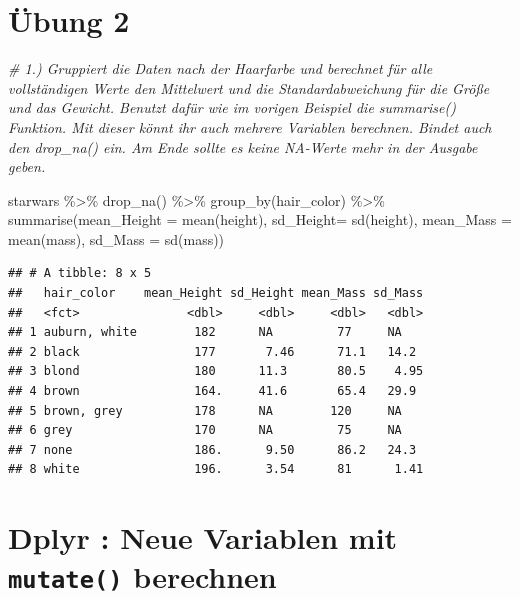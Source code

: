 \documentclass[
]{book}
\newenvironment{Shaded}{\begin{snugshade}}{\end{snugshade}}
\newcommand{\AttributeTok}[1]{\textcolor[rgb]{0.77,0.63,0.00}{#1}}
\newcommand{\CommentTok}[1]{\textcolor[rgb]{0.56,0.35,0.01}{\textit{#1}}}
\newcommand{\FunctionTok}[1]{\textcolor[rgb]{0.00,0.00,0.00}{#1}}
\newcommand{\NormalTok}[1]{#1}
\newcommand{\SpecialCharTok}[1]{\textcolor[rgb]{0.00,0.00,0.00}{#1}}
\theoremstyle{definition}
\theoremstyle{definition}
\theoremstyle{definition}
\theoremstyle{definition}
\theoremstyle{remark}
\begin{document}
\hypertarget{uxfcbung-2}{%
\section{Übung 2}\label{uxfcbung-2}}

\begin{Shaded}
\begin{Highlighting}[]
\CommentTok{\# 1.) Gruppiert die Daten nach der Haarfarbe und berechnet für alle vollständigen Werte den Mittelwert und die Standardabweichung für die Größe und das Gewicht. Benutzt dafür wie im vorigen Beispiel die summarise() Funktion. Mit dieser könnt ihr auch mehrere Variablen berechnen. Bindet auch den drop\_na() ein. Am Ende sollte es keine NA{-}Werte mehr in der Ausgabe geben. }

\NormalTok{starwars }\SpecialCharTok{\%\textgreater{}\%} \FunctionTok{drop\_na}\NormalTok{() }\SpecialCharTok{\%\textgreater{}\%} \FunctionTok{group\_by}\NormalTok{(hair\_color) }\SpecialCharTok{\%\textgreater{}\%}
  \FunctionTok{summarise}\NormalTok{(}\AttributeTok{mean\_Height =} \FunctionTok{mean}\NormalTok{(height),}
            \AttributeTok{sd\_Height=} \FunctionTok{sd}\NormalTok{(height),}
            \AttributeTok{mean\_Mass =} \FunctionTok{mean}\NormalTok{(mass),}
            \AttributeTok{sd\_Mass =} \FunctionTok{sd}\NormalTok{(mass)) }
\end{Highlighting}
\end{Shaded}

\begin{verbatim}
## # A tibble: 8 x 5
##   hair_color    mean_Height sd_Height mean_Mass sd_Mass
##   <fct>               <dbl>     <dbl>     <dbl>   <dbl>
## 1 auburn, white        182      NA         77     NA   
## 2 black                177       7.46      71.1   14.2 
## 3 blond                180      11.3       80.5    4.95
## 4 brown                164.     41.6       65.4   29.9 
## 5 brown, grey          178      NA        120     NA   
## 6 grey                 170      NA         75     NA   
## 7 none                 186.      9.50      86.2   24.3 
## 8 white                196.      3.54      81      1.41
\end{verbatim}

\hypertarget{dplyr-neue-variablen-mit-mutate-berechnen}{%
\section{\texorpdfstring{Dplyr : Neue Variablen mit \texttt{mutate()} berechnen}{Dplyr : Neue Variablen mit mutate() berechnen}}\label{dplyr-neue-variablen-mit-mutate-berechnen}}
\end{document}
